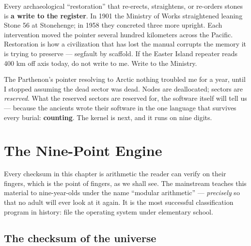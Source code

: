\documentclass[
  english,
  11pt,
  letterpaper,
]{scrbook}
\begin{document}
\begin{tcolorbox}[enhanced jigsaw, arc=.35mm, bottomrule=.15mm, bottomtitle=1mm, breakable, colback=white, colbacktitle=quarto-callout-warning-color!10!white, colframe=quarto-callout-warning-color-frame, coltitle=black, left=2mm, leftrule=.75mm, opacityback=0, opacitybacktitle=0.6, rightrule=.15mm, title=\textcolor{quarto-callout-warning-color}{\faExclamationTriangle}\hspace{0.5em}{Pointer corruption in progress}, titlerule=0mm, toprule=.15mm, toptitle=1mm]

Every archaeological ``restoration'' that re-erects, straightens, or
re-orders stones is \textbf{a write to the register}. In 1901 the
Ministry of Works straightened leaning Stone 56 at Stonehenge; in 1958
they concreted three more upright. Each intervention moved the pointer
several hundred kilometers across the Pacific. Restoration is how a
civilization that has lost the manual corrupts the memory it is trying
to preserve --- segfault by scaffold. If the Easter Island repeater
reads 400 km off axis today, do not write to me. Write to the Ministry.

\end{tcolorbox}

The Parthenon's pointer resolving to Arctic nothing troubled me for a
year, until I stopped assuming the dead sector was dead. Nodes are
deallocated; sectors are \emph{reserved}. What the reserved sectors are
reserved for, the software itself will tell us --- because the ancients
wrote their software in the one language that survives every burial:
\textbf{counting}. The kernel is next, and it runs on nine digits.

\chapter{The Nine-Point Engine}\label{sec-vortex}

Every checksum in this chapter is arithmetic the reader can verify on
their fingers, which is the point of fingers, as we shall see. The
mainstream teaches this material to nine-year-olds under the name
``modular arithmetic'' --- \emph{precisely} so that no adult will ever
look at it again. It is the most successful classification program in
history: file the operating system under elementary
school.

\section{The checksum of the
universe}\label{the-checksum-of-the-universe}
\end{document}
